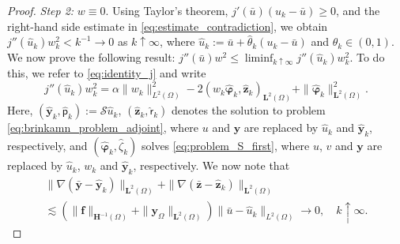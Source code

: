 \documentclass[final]{siamart0216}
\begin{document}
\begin{proof}
\emph{Step 2:} $w\equiv 0$. Using Taylor's theorem, $j'(\bar{u})(u_k-\bar{u})\geq 0$, and the right-hand side estimate in \eqref{eq:estimate_contradiction}, we obtain $j''(\hat{u}_k)w_k^2 < k^{-1}\to 0$ as $k \uparrow \infty$, where $\hat{u}_k:= \bar{u}+\hat{\theta}_k (u_k-\bar{u})$ and $\theta_k \in (0,1).$ We now prove the following result: $j''(\bar{u})w^2\leq \liminf_{k\uparrow \infty} j''(\hat{u}_k)w_k^2$. To do this, we refer to \eqref{eq:identity_j} and write
\begin{equation*}
j''(\hat{u}_k)w_k^2=\alpha\|w_k\|_{L^2(\Omega)}^2-2(w_k\hat{\boldsymbol{\varphi}}_k,\hat{\mathbf{z}}_k)_{\mathbf{L}^2(\Omega)}+\|\hat{\boldsymbol{\varphi}}_k\|_{\mathbf{L}^2(\Omega)}^2.
\end{equation*}
Here, $(\hat{\mathbf{y}}_k,\hat{\mathsf{p}}_k):=\mathcal{S}\hat{u}_k$, $(\hat{\mathbf{z}}_k,\hat{\mathsf{r}}_k)$ denotes the solution to problem \eqref{eq:brinkamn_problem_adjoint}, where $u$ and $\mathbf{y}$ are replaced by $\hat{u}_k$ and $\hat{\mathbf{y}}_k$, respectively, and $(\hat{\boldsymbol{\varphi}}_k,\hat{\zeta}_k)$ solves \eqref{eq:problem_S_first}, where $u$, $v$ and $\mathbf{y}$ are replaced by $\hat{u}_k$, $w_k$ and $\hat{\mathbf{y}}_k$, respectively. We now note that
\begin{multline*}
\|\nabla(\bar{\mathbf{y}}-\hat{\mathbf{y}}_k)\|_{\mathbf{L}^2(\Omega)}+\|\nabla(\bar{\mathbf{z}}-\hat{\mathbf{z}}_k)\|_{\mathbf{L}^2(\Omega)}
\\
\lesssim
(\|\mathbf{f}\|_{\mathbf{H}^{-1}(\Omega)}
+\|\mathbf{y}_{\Omega}\|_{\mathbf{L}^2(\Omega)})
\|\bar{u}-\hat{u}_k\|_{L^2(\Omega)}\to 0,
\quad k\uparrow\infty.
\end{multline*}


\end{proof}
\end{document}
